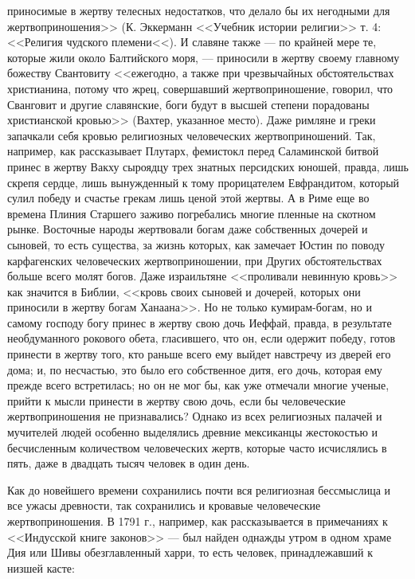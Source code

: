 \documentclass[12pt]{article}
\begin{document}
приносимые в жертву телесных недостатков, что делало бы их негодными для жертвоприношения>> (К. Эккерманн <<Учебник истории религии>>  т. 4: <<Религия чудского племени<<). И славяне также --- по крайней мере те, которые жили около Балтийского моря, --- приносили в жертву своему главному божеству Свантовиту <<ежегодно, а также при чрезвычайных обстоятельствах христианина, потому что жрец, совершавший жертвоприношение, говорил, что Сванговит и другие славянские, боги будут в высшей степени порадованы христианской кровью>> (Вахтер, указанное место). Даже римляне и греки запачкали себя кровью религиозных человеческих жертвоприношений. Так, например, как рассказывает Плутарх, фемистокл перед Саламинской битвой принес в жертву Вакху сыроядцу трех знатных персидских юношей, правда, лишь скрепя сердце, лишь вынужденный к тому прорицателем Евфрандитом, который сулил победу и счастье грекам лишь ценой этой жертвы. А в Риме еще во времена Плиния Старшего заживо погребались многие пленные на скотном рынке. Восточные народы жертвовали богам даже собственных дочерей и сыновей, то есть существа, за жизнь которых, как замечает Юстин по поводу карфагенских человеческих жертвоприношении, при Других обстоятельствах больше всего молят богов. Даже израильтяне <<проливали невинную кровь>>  как значится в Библии, <<кровь своих сыновей и дочерей, которых они приносили в жертву богам Ханаана>>. Но не только кумирам-богам, но и самому господу богу принес в жертву свою дочь Иеффай, правда, в результате необдуманного рокового обета, гласившего, что он, если одержит победу, готов принести в жертву того, кто раньше всего ему выйдет навстречу из дверей его дома; и, по несчастью, это было его собственное дитя, его дочь, которая ему прежде всего встретилась; но он не мог бы, как уже отмечали многие ученые, прийти к мысли принести в жертву свою дочь, если бы человеческие жертвоприношения не признавались? Однако из всех религиозных палачей и мучителей людей особенно выделялись древние мексиканцы жестокостью и бесчисленным количеством человеческих жертв, которые часто исчислялись в пять, даже в двадцать тысяч человек в один день. 

Как до новейшего времени сохранились почти вся религиозная бессмыслица и все ужасы древности, так сохранились и кровавые человеческие жертвоприношения. В 1791 г., например, как рассказывается в примечаниях к <<Индусской книге законов>>  --- был найден однажды утром в одном храме Дия или Шивы обезглавленный харри, то есть человек, принадлежавший к низшей касте: 
\end{document}
